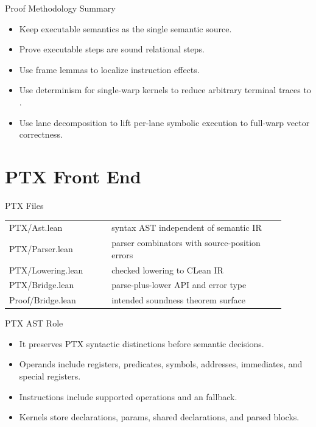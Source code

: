\documentclass[aspectratio=169,10pt]{beamer}
\newcommand{\lean}[1]{\texttt{\detokenize{#1}}}
\begin{document}
\begin{frame}{Proof Methodology Summary}
  \begin{itemize}
    \item Keep executable semantics as the single semantic source.
    \item Prove executable steps are sound relational steps.
    \item Use frame lemmas to localize instruction effects.
    \item Use determinism for single-warp kernels to reduce arbitrary terminal traces to \lean{runN}.
    \item Use lane decomposition to lift per-lane symbolic execution to full-warp vector correctness.
  \end{itemize}
\end{frame}

\section{PTX Front End}

\begin{frame}{PTX Files}
  \begin{tabular}{>{\ttfamily}p{0.33\linewidth}p{0.57\linewidth}}
    \toprule
    PTX/Ast.lean & syntax AST independent of semantic IR \\
    PTX/Parser.lean & parser combinators with source-position errors \\
    PTX/Lowering.lean & checked lowering to CLean IR \\
    PTX/Bridge.lean & parse-plus-lower API and error type \\
    Proof/Bridge.lean & intended soundness theorem surface \\
    \bottomrule
  \end{tabular}
\end{frame}

\begin{frame}{PTX AST Role}
  \begin{itemize}
    \item It preserves PTX syntactic distinctions before semantic decisions.
    \item Operands include registers, predicates, symbols, addresses, immediates, and special registers.
    \item Instructions include supported operations and an \lean{unsupported} fallback.
    \item Kernels store declarations, params, shared declarations, and parsed blocks.
  \end{itemize}
\end{frame}
\end{document}
